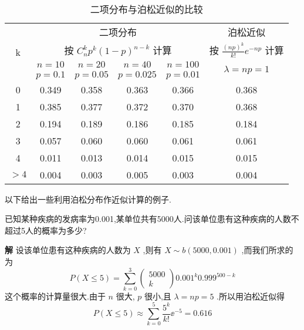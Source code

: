 \begin{table}[htbp]
	\centering
	\caption{二项分布与泊松近似的比较}
	\begin{tabular}{c|c|c|c|c|c}
		\toprule
		\multirow{4}{*}{k}   & \multicolumn{4}{c|}{二项分布}                                                                  & 泊松近似                                  \\
		& \multicolumn{4}{c|}{按 $ C_{n}^{k} p^{k}(1-p)^{n-k} $ 计算}                                     & 按 $ \tfrac{(n p)^{k}}{k !} e^{-n p} $ 计算 \\\cline{2-6}
		& $ n=10 $ & $ n=20 $ & $ n=40 $ & $ n=100 $ & \multirow{2}{*}{ $ \lambda=n p=1 $ }      \\
		& $ p=0.1 $ & $ p=0.05 $ & $ p=0.025 $ & $ p=0.01 $ &                                       \\\midrule
		0                    & 0.349                & 0.358                & 0.363                & 0.366                & 0.368                                 \\
		1                    & 0.385                & 0.377                & 0.372                & 0.370                & 0.368                                 \\
		2                    & 0.194                & 0.189                & 0.186                & 0.185                & 0.184                                 \\
		3                    & 0.057                & 0.060                & 0.060                & 0.061                & 0.061                                 \\
		4                    & 0.011                & 0.013                & 0.014                & 0.015                & 0.015                                 \\
		 $ >4 $ & 0.004                & 0.003                & 0.005                & 0.003                & 0.004                                 \\\bottomrule           
	\end{tabular}
	\label{tab:2.4.3}
\end{table}

以下给出一些利用泊松分布作近似计算的例子.

\begin{example}\label{exam:2.4.6}
	已知某种疾病的发病率为0.001,某单位共有5000人.问该单位患有这种疾病的人数不超过5人的概率为多少?
	
	\textbf{解} 设该单位患有这种疾病的人数为 $ X $ ,则有 $ X\sim b(5000,0.001) $ ,而我们所求的为
	\[
	P(X \leqslant 5)=\sum_{k=0}^{3} \left( 
	\begin{array}{c}{5000} \\ 
	{k}
	\end{array}\right) 0.001^{k} 0.999^{500-k}
	\]
	这个概率的计算量很大.由于 $ n $ 很大, $ p $ 很小,且 $ \lambda=n p=5 $ .所以用泊松近似得
	\[
	P(X \leqslant 5) \approx \sum_{k=0}^{5} \frac{5^{k}}{k !} \ee ^{-5}=0.616
	\]
	
\end{example}


